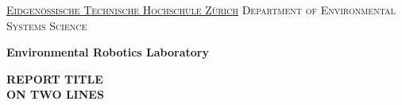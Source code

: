 \linespread{1} 

\thispagestyle{empty}
\large

\begin{figure}[H]
	\centering
	\hspace{2.5cm}
\end{figure}

\vspace{0.5cm}

\begin{center}
	\LARGE{{\underline{\textsc{Eidgen\"ossische Technische Hochschule Z\"urich}}}}
	\Large{\textsc{Department of Environmental Systems Science}}
\end{center}

\begin{center}   
	\LARGE{\textbf{Environmental Robotics Laboratory}}      	
\end{center}

\vspace{1.2cm}

\begin{center}
	{\LARGE \textbf{REPORT TITLE \\ ON TWO LINES}		 \smallskip\\}                                               
\end{center}

